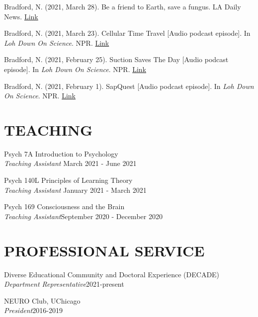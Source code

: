 \documentclass[margin, 10pt]{res} %
\begin{document}
\begin{resume}
Bradford, N. (2021, March 28). Be a friend to Earth, save a fungus. LA Daily News. \href{https://www.dailynews.com/2021/03/28/be-a-friend-to-earth-save-a-fungus/}{Link}

Bradford, N. (2021, March 23). Cellular Time Travel [Audio podcast episode]. In {\sl Loh Down On Science}. NPR.  \href{https://lohdownonscience.com/cellular-time-travel/}{Link}

Bradford, N. (2021, February 25). Suction Saves The Day [Audio podcast episode]. In {\sl Loh Down On Science}. NPR.  \href{https://lohdownonscience.com/suction-saves-the-day/}{Link}

Bradford, N. (2021, February 1). SapQuest [Audio podcast episode]. In {\sl Loh Down On Science}. NPR.  \href{https://lohdownonscience.com/sapquest/}{Link}





\section{TEACHING}
Psych 7A Introduction to Psychology \\ 
{\sl Teaching Assistant} \hfill {March 2021 - June 2021}

Psych 140L Principles of Learning Theory \\ 
{\sl Teaching Assistant} \hfill {January 2021 - March 2021} 

Psych 169 Consciousness and the Brain \\
{\sl Teaching Assistant}\hfill {September 2020 - December 2020} 



\section{PROFESSIONAL SERVICE}

{Diverse Educational Community and Doctoral Experience (DECADE)} \\
{\sl Department Representative}\hfill 2021-present

{NEURO Club, UChicago} \\
{\sl President}\hfill{2016-2019}


\end{resume}
\end{document}
